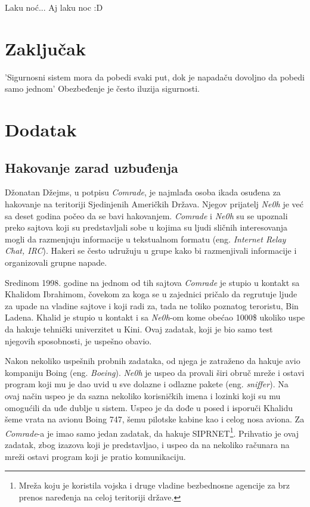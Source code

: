 \documentclass[a4paper]{article}
\begin{document}
Laku noć...
Aj laku noc :D


\section{Zaključak}
\label{sec:zakljucak}

'Sigurnosni sistem mora da pobedi svaki put, dok je napadaču dovoljno da pobedi samo jednom' \cite{intrusion}
Obezbeđenje je često iluzija sigurnosti. \cite{deception}

\appendix
 


\appendix
\section{Dodatak}

\subsection{Hakovanje zarad uzbuđenja}
\label{mladi_hakeri}

Džonatan Džejms, u potpisu \textit{Comrade}, je najmlađa osoba ikada osuđena za hakovanje na teritoriji Sjedinjenih Američkih Država. Njegov prijatelj \textit{Ne0h} je već sa deset godina počeo da se bavi hakovanjem.  \textit{Comrade} i \textit{Ne0h} su se upoznali preko sajtova koji su predstavljali sobe u kojima su ljudi sličnih interesovanja mogli da razmenjuju informacije u tekstualnom formatu (eng. \textit{Internet Relay Chat, IRC}). Hakeri se često udružuju u grupe kako bi razmenjivali informacije i organizovali grupne napade.

Sredinom 1998. godine na jednom od tih sajtova \textit{Comrade} je stupio u kontakt sa Khalidom Ibrahimom, čovekom za koga se u zajednici pričalo da regrutuje ljude za upade na vladine sajtove i koji radi za, tada ne toliko poznatog teroristu, Bin Ladena. Khalid je stupio u kontakt i sa \textit{Ne0h}-om kome obećao 1000\$ ukoliko uspe da hakuje tehnički univerzitet u Kini. Ovaj zadatak, koji je bio samo test njegovih sposobnosti, je uspešno obavio.

Nakon nekoliko uspešnih probnih zadataka, od njega je zatraženo da hakuje avio kompaniju Boing (eng. \textit{Boeing}). \textit{Ne0h} je uspeo da provali širi obruč mreže i ostavi program koji mu je dao uvid u sve dolazne i odlazne pakete (eng. \textit{sniffer}). Na ovaj način uspeo je da sazna nekoliko korisničkih imena i lozinki koji su mu omogućili da uđe dublje u sistem. Uspeo je da dođe u posed i isporuči Khalidu šeme vrata na avionu Boing 747, šemu pilotske kabine kao i celog nosa aviona. Za \textit{Comrade}-a je imao samo jedan zadatak, da hakuje SIPRNET\footnote{Mreža koju je koristila vojska i druge vladine bezbednosne agencije za brz prenos naređenja na celoj teritoriji države.}. Prihvatio je ovaj zadatak, zbog izazova koji je predstavljao, i uspeo da na nekoliko računara na mreži ostavi program koji je pratio komunikaciju.
\end{document}
